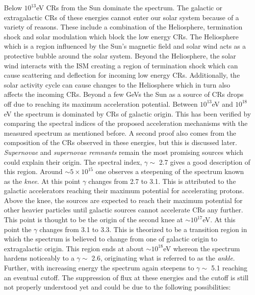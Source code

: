 Below $10^{13}$eV \glspl{CR} from the Sun dominate the spectrum. The galactic or extragalactic \glspl{CR} of these energies cannot enter our solar system because of a variety of reasons. These include a combination of the Heliosphere, termination shock and solar modulation which block the low energy \glspl{CR}. The Heliosphere which is a region influenced by the Sun's magnetic field and solar wind acts as a protective bubble around the solar system. Beyond the Heliosphere, the solar wind interacts with the ISM creating a region of termination shock which can cause scattering and deflection for incoming low energy \glspl{CR}. Additionally, the solar activity cycle can cause changes to the Heliosphere which in turn also affects the incoming \glspl{CR}. Beyond a few GeVs the Sun as a source of \glspl{CR} drops off due to reaching its maximum acceleration potential. Between $10^{13}$eV and $10^{18}$eV the spectrum is dominated by \glspl{CR} of galactic origin. This has been verified by comparing the spectral indices of the proposed acceleration mechanisms with the measured spectrum as mentioned before. A second proof also comes from the composition of the \glspl{CR} observed in these energies, but this is discussed later. \textit{Supernovae} and \textit{supernovae remnants} remain the most promising sources which could explain their origin. The spectral index, $\gamma \sim$ 2.7 gives a good description of this region. Around $\sim5 \times 10^{15}$ one observes a steepening of the spectrum known as the \textit{knee}. At this point $\gamma$ changes from 2.7 to 3.1. This is attributed to the galactic accelerators reaching their maximum potential for accelerating protons. Above the knee, the sources are expected to reach their maximum potential for other heavier particles until galactic sources cannot accelerate \glspl{CR} any further. This point is thought to be the origin of the second knee at $\sim 10^{17}$eV. At this point the $\gamma$ changes from 3.1 to 3.3. This is theorized to be a transition region in which the spectrum is believed to change from one of galactic origin to extragalactic origin. This region ends at about $\sim 10^{18}$eV whereon the spectrum hardens noticeably to a $\gamma \sim$ 2.6, originating what is referred to as the \textit{ankle}. Further, with increasing energy the spectrum again steepens to $\gamma \sim$ 5.1 reaching an eventual cutoff. The suppression of flux at these energies and the cutoff is still not properly understood yet and could be due to the following possibilities:

